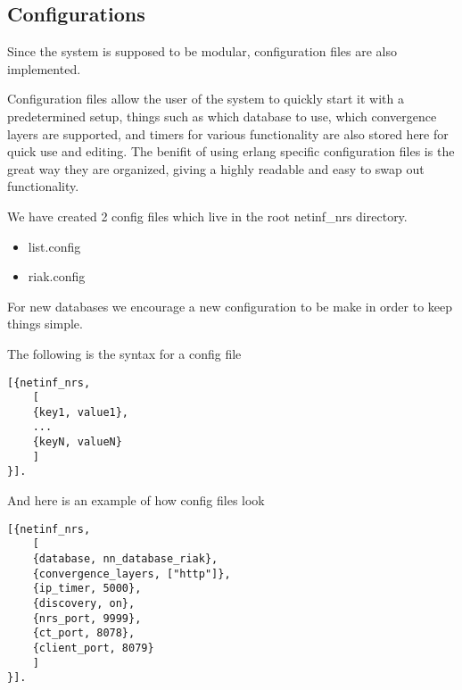 \subsection {Configurations}

Since the system is supposed to be modular, configuration files are also implemented. 

Configuration files allow the user of the system to quickly start it with a predetermined setup, things such as which database to use, which convergence layers are supported, and timers for various functionality are also stored here for quick use and editing. The benifit of using erlang specific configuration files is the great way they are organized, giving a highly readable and easy to swap out functionality. 

We have created 2 config files which live in the root netinf\_nrs directory.

\begin {itemize}
\item list.config
\item riak.config
\end {itemize}

For new databases we encourage a new configuration to be make in order to keep things simple.


The following is the syntax for a config file 

\begin {verbatim}
[{netinf_nrs,
	[
	{key1, value1},
	...
	{keyN, valueN}
	]
}].

\end{verbatim}
And here is an example of how config files look
\begin {verbatim}
[{netinf_nrs,
	[
	{database, nn_database_riak},
	{convergence_layers, ["http"]},
	{ip_timer, 5000},
	{discovery, on},
	{nrs_port, 9999},
	{ct_port, 8078},
	{client_port, 8079}
	]
}].

\end{verbatim}

